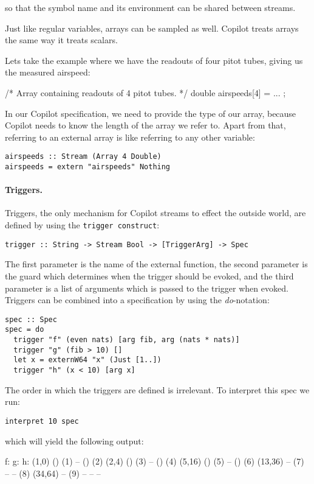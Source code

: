 \noindent
so that the symbol name and its environment can be shared between streams.

Just like regular variables, arrays can be sampled as well. Copilot treats
arrays the same way it treats scalars. 
\begin{example}
\label{exmp:pitot}
Lets take the example where we
have the readouts of four pitot tubes, giving us the measured airspeed:
\begin{code}[frame=single]
/* Array containing readouts of 4 pitot tubes. */
double airspeeds[4] = ... ;
\end{code}
In our Copilot specification, we need to provide the type of our array, because
Copilot needs to know the length of the array we refer to. Apart from that,
referring to an external array is like referring to any other variable:
\begin{lstlisting}[language=Copilot, frame=single]
airspeeds :: Stream (Array 4 Double)
airspeeds = extern "airspeeds" Nothing
\end{lstlisting}
\end{example}


\paragraph{Triggers.}
Triggers, the only mechanism for Copilot streams to effect the outside world,
are defined by using the {\tt trigger construct}:
%
\begin{lstlisting}[language = Copilot, frame = single]
trigger :: String -> Stream Bool -> [TriggerArg] -> Spec
\end{lstlisting}
%
The first parameter is the name of the external function, the second parameter is the
guard which determines when the trigger should be evoked, and the third parameter
is a list of arguments which is passed to the trigger when evoked.
Triggers can be combined into a specification by using the \emph{do}-notation:
%
\begin{lstlisting}[language = Copilot, frame = single]
spec :: Spec
spec = do
  trigger "f" (even nats) [arg fib, arg (nats * nats)]
  trigger "g" (fib > 10) []
  let x = externW64 "x" (Just [1..])
  trigger "h" (x < 10) [arg x]
\end{lstlisting}
%
The order in which the triggers are defined is irrelevant. To interpret this spec we run:
%
\begin{lstlisting}[language = Copilot, frame = single]
interpret 10 spec
\end{lstlisting}
%
which will yield the following output:
%
\begin{code}
f:        g:	 h:
(1,0)     ()        (1)
--        ()        (2)
(2,4)     ()        (3)
--        ()        (4)
(5,16)    ()        (5)
--        ()        (6)
(13,36)   --	(7)
--        --        (8)
(34,64)   --	(9)
--        --         --
\end{code}
%

